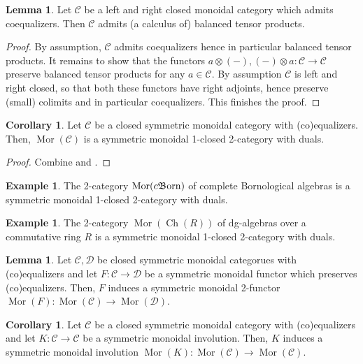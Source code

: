 \documentclass{article}
\newcommand{\Mor}{\operatorname{Mor}}%
\newcommand{\cBorn}{c\mathfrak{B}\hspace{-0.05cm}\operatorname{orn}}%
\newcommand{\Ch}{\operatorname{Ch}}%
\newcommand{\C}{\mathcal{C}}
\newcommand{\D}{\mathcal{D}}
\numberwithin{equation}{section}
\theoremstyle{definition}
\newtheorem{example}[definition]{Example}
\newtheorem{lemma}[definition]{Lemma}
\newtheorem{corollary}[definition]{Corollary}
\theoremstyle{theorem}
\begin{document}
\begin{lemma}\label{Lemma: closedness and balanced tensor products}
    Let $\C$ be a left and right closed monoidal category which admits coequalizers. Then $\C$ admits (a calculus of) balanced tensor products.
\end{lemma}
\begin{proof}
    By assumption, $\C$ admits coequalizers hence in particular balanced tensor products. It remains to show that the functors 
    $a \otimes (-), (-) \otimes a \colon \C \to \C$ preserve balanced tensor products for any $a \in \C$.
    By assumption $\C$ is left and right closed, so that both these functors have right adjoints, hence preserve (small) colimits and in particular coequalizers. 
    This finishes the proof. 
\end{proof}
\begin{corollary}\label{Corollary: Morita 2-categories of nice categories}
    Let $\C$ be a closed symmetric monoidal category with (co)equalizers. Then, $\Mor(\C)$ is a symmetric monoidal 1-closed 2-category with duals.
\end{corollary}
\begin{proof}
    Combine  and . 
\end{proof}
\begin{example}
    The 2-category $\Mor(\cBorn)$ of complete Bornological algebras is a symmetric monoidal 1-closed 2-category with duals. 
\end{example}
\begin{example}
    The 2-category $\Mor(\Ch(R))$ of dg-algebras over a commutative ring $R$ is a symmetric monoidal 1-closed 2-category with duals. 
\end{example}
\begin{lemma}\label{Lemma: Functors between Morita 2-categories}
    Let $\C,\D$ be closed symmetric monoidal categorues with (co)equalizers and let $F \colon \C \to \D$ be a symmetric monoidal functor which preserves 
    (co)equalizers. Then, $F$ induces a symmetric monoidal 2-functor $\Mor(F) \colon \Mor(\C) \to \Mor(\D)$.
\end{lemma}
\begin{corollary}
    Let $\C$ be a closed symmetric monoidal category with (co)equalizers and let $K \colon \C \to \C$ be a symmetric monoidal involution. Then, 
    $K$ induces a symmetric monoidal involution $\Mor(K) \colon \Mor(\C) \to \Mor(\C)$.
\end{corollary}
\end{document}
